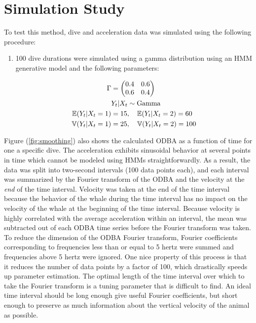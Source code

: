 
\section{Simulation Study}

To test this method, dive and acceleration data was simulated using the following procedure: 

\begin{enumerate}
	\item 100 dive durations were simulated using a gamma distribution using an HMM generative model and the following parameters:
	
	\begin{align*}
		\Gamma &= \begin{pmatrix} 0.4 & 0.6 \\ 0.6 & 0.4 \end{pmatrix} \\
		&Y_t|X_t \sim \text{Gamma} \\
		\mathbb{E}(Y_t|X_t = 1) &= 15, \quad \mathbb{E}(Y_t|X_t = 2) = 60 \\
		\mathbb{V}(Y_t|X_t = 1) &= 25, \quad \mathbb{V}(Y_t|X_t = 2) = 100
	\end{align*}
\end{enumerate}

Figure (\ref{fig:smoothing}) also shows the calculated ODBA as a function of time for one a specific dive. The acceleration exhibits sinusoidal behavior at several points in time which cannot be modeled using HMMs straightforwardly. As a result, the data was split into two-second intervals (100 data points each), and each interval was summarized by the Fourier transform of the ODBA and the velocity at the \textit{end} of the time interval. Velocity was taken at the end of the time interval because the behavior of the whale during the time interval has no impact on the velocity of the whale at the beginning of the time interval. Because velocity is highly correlated with the average acceleration within an interval, the mean was subtracted out of each ODBA time series before the Fourier transform was taken. To reduce the dimension of the ODBA Fourier transform, Fourier coefficients corresponding to frequencies less than or equal to 5 hertz were summed and frequencies above 5 hertz were ignored. One nice property of this process is that it reduces the number of data points by a factor of 100, which drastically speeds up parameter estimation. The optimal length of the time interval over which to take the Fourier transform is a tuning parameter that is difficult to find. An ideal time interval should be long enough give useful Fourier coefficients, but short enough to preserve as much information about the vertical velocity of the animal as possible.

